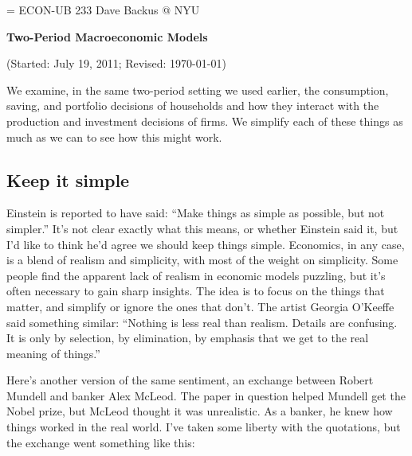 \documentclass[11pt]{article}
\begin{document}
\parskip=\bigskipamount
\parindent=0.0in
\thispagestyle{empty}
{\large ECON-UB 233 \hfill Dave Backus @ NYU}

\bigskip\bigskip
\centerline{\Large \bf Two-Period Macroeconomic Models}
\centerline{(Started: July 19, 2011; Revised: \today)}

\bigskip
We examine, in the same two-period setting we used earlier,
the consumption,
saving, and portfolio decisions of households
and how they interact with the
production and investment decisions of firms.
We simplify each of these things as much as we can
 to see how this might work.

\subsection*{Keep it simple}

Einstein is reported to have said:
``Make things as simple as possible, but not simpler.''
It's not clear exactly what this means, or whether Einstein said it,
but I'd like to think he'd agree we should keep things simple.
Economics, in any case, is a blend of realism and simplicity,
with most of the weight on simplicity.
Some people find the apparent lack of realism in economic models puzzling,
but it's often necessary to gain sharp insights.
The idea is to focus on the things that matter,
and simplify or ignore the ones that don't.
The artist Georgia O'Keeffe said something similar:
``Nothing is less real than realism. Details are confusing. It is only by
selection, by elimination, by emphasis that we get to the real meaning of
things.''

Here's another version of the same sentiment,
an exchange between Robert Mundell and banker Alex McLeod.
The paper in question helped Mundell get the Nobel prize,
but McLeod thought it was unrealistic.
As a banker, he knew how things worked in the real world.
I've taken some liberty with the quotations, but the exchange went something like this:
\end{document}
